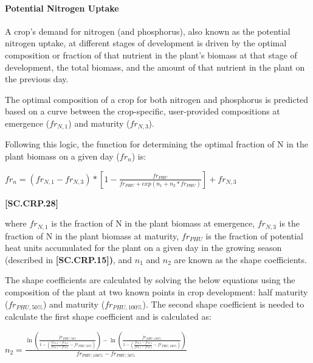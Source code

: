\paragraph{Potential Nitrogen Uptake}
\vspace{-0.25cm}

A crop’s demand for nitrogen (and phosphorus), also known as the potential nitrogen uptake, at different stages of development is driven by the optimal composition or fraction of that nutrient in the plant’s biomass at that stage of development, the total biomass, and the amount of that nutrient in the plant on the previous day. 

The optimal composition of a crop for both nitrogen and phosphorus is predicted based on a curve between the crop-specific, user-provided compositions at emergence (\(fr_{N,1}\)) and maturity (\(fr_{N,3}\)). 

Following this logic, the function for determining the optimal fraction of N in the plant biomass on a given day (\(fr_{n}\)) is:
    \vspace{0.2cm}

    \begin{center}
        \(fr_{n}=(fr_{N,1}-fr_{N,3}) * [1-\frac{fr_{PHU}}{fr_{PHU}+exp(n_{1}+n_{2} * fr_{PHU})}] + fr_{N,3}\)
    \end{center}
        \vspace{0.5cm}
    
            {\raggedleft \textbf{[SC.CRP.28]}\par}
            \vspace{0.5cm}

where \(fr_{N,1}\) is the fraction of N in the plant biomass at emergence, \(fr_{N,3}\) is the fraction of N in the plant biomass at maturity, \(fr_{PHU}\) is the fraction of potential heat units accumulated for the plant on a given day in the growing season (described in \textbf{[SC.CRP.15])}, and \(n_1\) and \(n_2\) are known as the shape coefficients. 

The shape coefficients are calculated by solving the below equations using the composition of the plant at two known points in crop development: half maturity (\(fr_{PHU,50\%}\)) and maturity (\(fr_{PHU,100\%}\)). The second shape coefficient is needed to calculate the first shape coefficient and is calculated as:
\vspace{0.2cm}

\begin{center}
\(
n_2 = \frac{
\ln\left( \frac{fr_{PHU,50\%}}{1 - \left( \frac{fr_{N,2} - fr_{N,3}}{fr_{N,1} - fr_{N,3}} - fr_{PHU,50\%} \right)} \right)
- 
\ln\left( \frac{fr_{PHU,100\%}}{1 - \left( \frac{fr_{N,3} - fr_{N,3}}{fr_{N,1} - fr_{N,3}} - fr_{PHU,100\%} \right)} \right)
}{
fr_{PHU,100\%} - fr_{PHU,50\%}
}
\)
\end{center}
\vspace{0.5cm}
    
